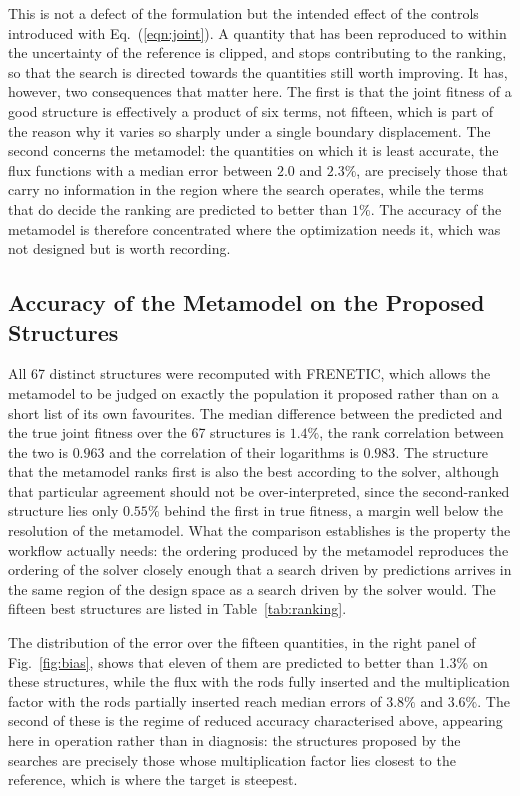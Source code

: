 \documentclass{style/nseJournal}
\begin{document}
This is not a defect of the formulation but the intended effect of the controls
introduced with Eq.~(\ref{eqn:joint}). A quantity that has been reproduced to
within the uncertainty of the reference is clipped, and stops contributing to
the ranking, so that the search is directed towards the quantities still worth
improving. It has, however, two consequences that matter here. The first is that
the joint fitness of a good structure is effectively a product of six terms, not
fifteen, which is part of the reason why it varies so sharply under a single
boundary displacement. The second concerns the metamodel: the quantities on
which it is least accurate, the flux functions with a median error between $2.0$
and $2.3\%$, are precisely those that carry no information in the region where
the search operates, while the terms that do decide the ranking are predicted to
better than $1\%$. The accuracy of the metamodel is therefore concentrated where
the optimization needs it, which was not designed but is worth recording.

\subsection{Accuracy of the Metamodel on the Proposed Structures}

All 67 distinct structures were recomputed with FRENETIC, which allows the
metamodel to be judged on exactly the population it proposed rather than on a
short list of its own favourites. The median difference between the predicted
and the true joint fitness over the 67 structures is $1.4\%$, the rank
correlation between the two is $0.963$ and the correlation of their logarithms
is $0.983$. The structure that the metamodel ranks first is also the best
according to the solver, although that particular agreement should not be
over-interpreted, since the second-ranked structure lies only $0.55\%$ behind
the first in true fitness, a margin well below the resolution of the metamodel.
What the comparison establishes is the property the workflow actually needs: the
ordering produced by the metamodel reproduces the ordering of the solver closely
enough that a search driven by predictions arrives in the same region of the
design space as a search driven by the solver would. The fifteen best structures
are listed in Table~\ref{tab:ranking}.



The distribution of the error over the fifteen quantities, in the right panel of
Fig.~\ref{fig:bias}, shows that eleven of them are predicted to better than
$1.3\%$ on these structures, while the flux with the rods fully inserted and the
multiplication factor with the rods partially inserted reach median errors of
$3.8\%$ and $3.6\%$. The second of these is the regime of reduced accuracy
characterised above, appearing here in operation rather than in diagnosis: the structures proposed by the searches are precisely those whose
multiplication factor lies closest to the reference, which is where the target
is steepest.
\end{document}
